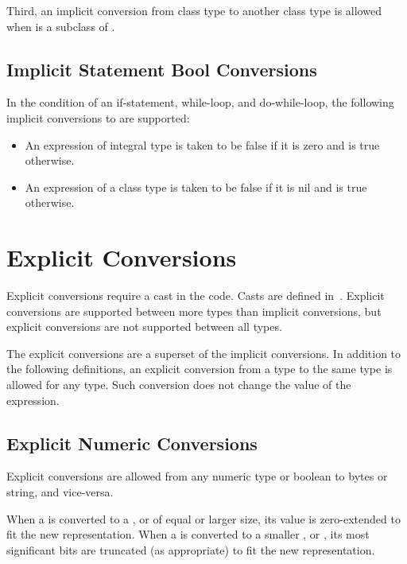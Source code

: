 Third, an implicit conversion from class type  to another class
type  is allowed when  is a subclass of .

\subsection{Implicit Statement Bool Conversions}
\label{Implicit_Statement_Bool_Conversions}

In the condition of an if-statement, while-loop, and do-while-loop,
the following implicit conversions to  are supported:
\begin{itemize}
\item An expression of integral type is taken to be false if it is zero and is true otherwise.
\item An expression of a class type is taken to be false if it is nil and is true otherwise.
\end{itemize}

\section{Explicit Conversions}
\label{Explicit_Conversions}

Explicit conversions require a cast in the code.  Casts are defined
in~.  Explicit conversions are supported between more
types than implicit conversions, but explicit conversions are not
supported between all types.

The explicit conversions are a superset of the implicit conversions.
In addition to the following definitions,
an explicit conversion from a type to the same type is allowed for any type.
Such conversion does not change the value of the expression.

\subsection{Explicit Numeric Conversions}
\label{Explicit_Numeric_Conversions}

Explicit conversions are allowed from any numeric type or boolean to bytes or
string, and vice-versa.

When a  is converted to a , 
or  of equal or larger size, its value is zero-extended to fit the
new representation.  When a  is converted to a
smaller ,  or , its most significant
bits are truncated (as appropriate) to fit the new representation.

